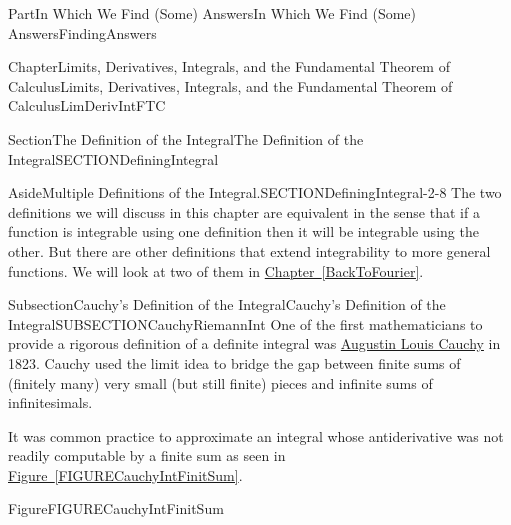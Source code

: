 \documentclass[oneside,10pt,]{book}
\newcommand{\xreffont}{\relax}
\numberwithin{equation}{part}
\begin{document}
\begin{partptx}{Part}{In Which We Find (Some) Answers}{}{In Which We Find (Some) Answers}{}{}{FindingAnswers}
\begin{chapterptx}{Chapter}{Limits, Derivatives, Integrals, and the Fundamental Theorem of Calculus}{}{Limits, Derivatives, Integrals, and the Fundamental Theorem of Calculus}{}{}{LimDerivIntFTC}
\begin{sectionptx}{Section}{The Definition of the Integral}{}{The Definition of the Integral}{}{}{SECTIONDefiningIntegral}
\begin{introduction}{}
\begin{aside}{Aside}{Multiple Definitions of the Integral.}{SECTIONDefiningIntegral-2-8}%
The two definitions we will discuss in this chapter are equivalent in the sense that if a function is integrable using one definition then it will be integrable using the other.  But there are other definitions that extend integrability to more general functions. We will look at two of them in \hyperref[BackToFourier]{Chapter~{\xreffont\ref{BackToFourier}}}.%
\end{aside}
\end{introduction}%
%
%
\typeout{************************************************}
\typeout{************************************************}
%
\begin{subsectionptx}{Subsection}{Cauchy's Definition of the Integral}{}{Cauchy's Definition of the Integral}{}{}{SUBSECTIONCauchyRiemannInt}
One of the first mathematicians to provide a rigorous definition of a definite integral was \href{https://mathshistory.st-andrews.ac.uk/Biographies/Cauchy/}{Augustin Louis Cauchy} in 1823. Cauchy used the limit idea to bridge the gap between finite sums of (finitely many) very small (but still finite) pieces and infinite sums of infinitesimals.%
\par
It was common practice to approximate an integral whose antiderivative was not readily computable by a finite sum as seen in \hyperref[FIGURECauchyIntFinitSum]{Figure~{\xreffont\ref{FIGURECauchyIntFinitSum}}}.%
\begin{figureptx}{Figure}{}{FIGURECauchyIntFinitSum}{}%
\begin{image}{0.275}{0.45}{0.275}{}%

\end{image}
\end{figureptx}
\end{subsectionptx}
\end{sectionptx}
\end{chapterptx}
\end{partptx}
\end{document}
